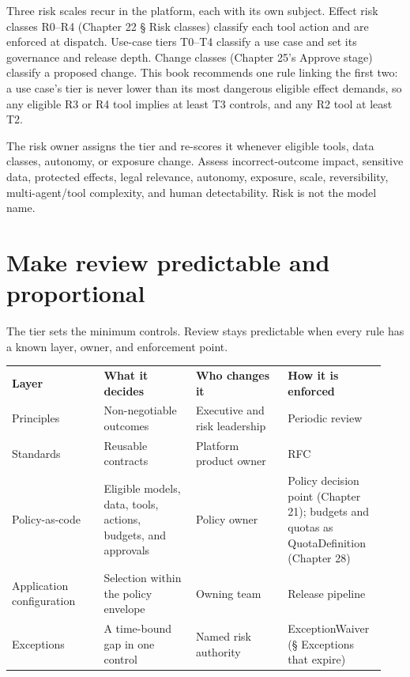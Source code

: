 Three risk scales recur in the platform, each with its own subject. Effect risk classes R0–R4 (Chapter 22 § Risk classes) classify each tool action and are enforced at dispatch. Use-case tiers T0–T4 classify a use case and set its governance and release depth. Change classes (Chapter 25's Approve stage) classify a proposed change. This book recommends one rule linking the first two: a use case's tier is never lower than its most dangerous eligible effect demands, so any eligible R3 or R4 tool implies at least T3 controls, and any R2 tool at least T2.\par

The risk owner assigns the tier and re-scores it whenever eligible tools, data classes, autonomy, or exposure change. Assess incorrect-outcome impact, sensitive data, protected effects, legal relevance, autonomy, exposure, scale, reversibility, multi-agent/tool complexity, and human detectability. Risk is not the model name.\par

\section{Make review predictable and proportional}

The tier sets the minimum controls. Review stays predictable when every rule has a known layer, owner, and enforcement point.\par

\BookTableStart
\fontsize{7.2}{9}\selectfont
\begin{tabular}{@{}Y{0.2350\linewidth}Y{0.2350\linewidth}Y{0.2350\linewidth}Y{0.2350\linewidth}@{}}
\color{white}\bfseries \textbf{Layer} & \color{white}\bfseries \textbf{What it decides} & \color{white}\bfseries \textbf{Who changes it} & \color{white}\bfseries \textbf{How it is enforced} \\
Principles & Non-negotiable outcomes & Executive and risk leadership & Periodic review \\
Standards & Reusable contracts & Platform product owner & RFC \\
Policy-as-code & Eligible models, data, tools, actions, budgets, and approvals & Policy owner & Policy decision point (Chapter 21); budgets and quotas as QuotaDefinition (Chapter 28) \\
Application configuration & Selection within the policy envelope & Owning team & Release pipeline \\
Exceptions & A time-bound gap in one control & Named risk authority & ExceptionWaiver (§ Exceptions that expire) \\
\end{tabular}
\BookTableEnd

